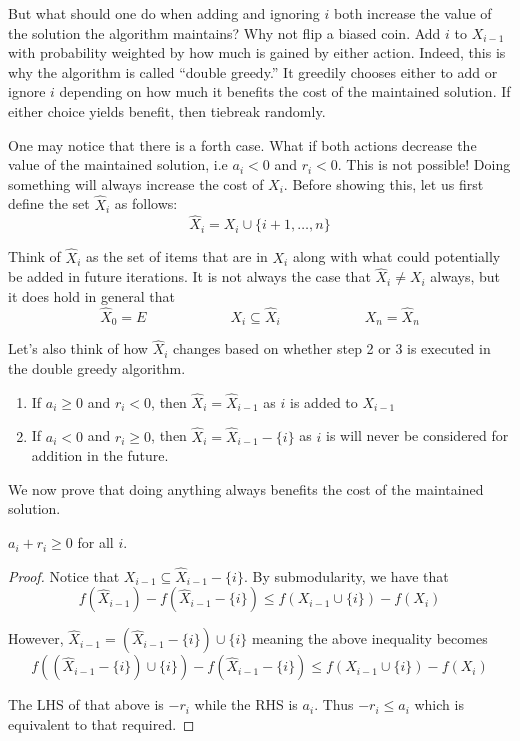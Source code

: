 \documentclass{article}
\begin{document}
But what should one do when adding and ignoring $i$ both increase the value of the solution the algorithm maintains? Why not flip a biased coin. Add $i$ to $X_{i-1}$ with probability weighted by how much is gained by either action. Indeed, this is why the algorithm is called ``double greedy.'' It greedily chooses either to add or ignore $i$ depending on how much it benefits the cost of the maintained solution. If either choice yields benefit, then tiebreak randomly.

One may notice that there is a forth case. What if both actions decrease the value of the maintained solution, i.e $a_i < 0$ and $r_i < 0$. This is not possible! Doing something will always increase the cost of $X_i$. Before showing this, let us first define the set $\hat{X}_i$ as follows:
\begin{equation*}
\hat{X}_i = X_i \cup \{ i+1, \ldots, n \}
\end{equation*}

Think of $\hat{X}_i$ as the set of items that are in $X_i$ along with what could potentially be added in future iterations. It is not always the case that $\hat{X}_i \neq X_i$ always, but it does hold in general that
\begin{equation*}
\hat{X}_0 = E
\qquad\qquad\qquad
X_i \subseteq \hat{X}_i
\qquad\qquad\qquad
X_n = \hat{X}_n
\end{equation*}

Let's also think of how $\hat{X}_i$ changes based on whether step 2 or 3 is executed in the double greedy algorithm.
\vspace{-1em}
\begin{enumerate}[-]
\item If $a_i \geq 0$ and $r_i < 0$, then $\hat{X}_i = \hat{X}_{i-1}$ as $i$ is added to $X_{i-1}$

\item If $a_i < 0$ and $r_i \geq 0$, then $\hat{X}_i = \hat{X}_{i-1} - \{ i \}$ as $i$ is will never be considered for addition in the future.
\end{enumerate}

We now prove that doing anything always benefits the cost of the maintained solution.
\begin{claim}\label{claim:do-something}
$a_i + r_i \geq 0$ for all $i$.
\end{claim}
\begin{proof}
Notice that $X_{i-1} \subseteq \hat{X}_{i-1} - \{ i \}$. By submodularity, we have that
\begin{equation*}
f(\hat{X}_{i-1}) - f(\hat{X}_{i-1} - \{ i \}) \leq f(X_{i-1} \cup \{ i \}) - f(X_i)
\end{equation*}

However, $\hat{X}_{i-1} = (\hat{X}_{i-1} - \{ i \}) \cup \{ i \}$ meaning the above inequality becomes
\begin{equation*}
f((\hat{X}_{i-1} - \{ i \}) \cup \{ i \}) - f(\hat{X}_{i-1} - \{ i \}) \leq f(X_{i-1} \cup \{ i \}) - f(X_i)
\end{equation*}

The LHS of that above is $-r_i$ while the RHS is $a_i$. Thus $-r_i \leq a_i$ which is equivalent to that required.
\end{proof}
\end{document}
